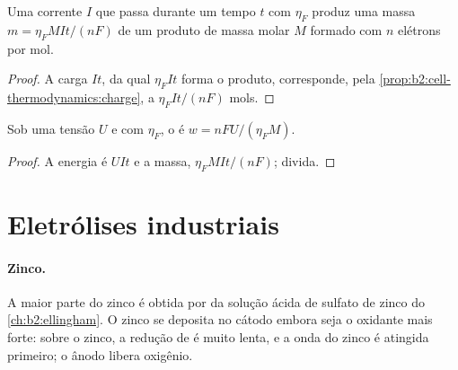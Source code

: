 \begin{proposition}\label{prop:b2:batteries-electrolysis:faraday-mass}
Uma corrente $I$ que passa durante um tempo $t$ com 
$\eta_F$ produz uma massa $m = \eta_F MIt/(nF)$ de um produto de massa molar
$M$ formado com $n$ elétrons por mol.
\end{proposition}

\begin{proof}
A carga $It$, da qual $\eta_F It$ forma o produto, corresponde, pela
\cref{prop:b2:cell-thermodynamics:charge}, a $\eta_F It/(nF)$ mols.
\end{proof}

\begin{proposition}\label{prop:b2:batteries-electrolysis:energy}
Sob uma tensão $U$ e com  $\eta_F$, o  é $w = nFU/(\eta_F M)$.
\end{proposition}

\begin{proof}
A energia é $UIt$ e a massa, $\eta_F MIt/(nF)$; divida.
\end{proof}

\section{Eletrólises industriais}

\paragraph{Zinco.} A maior parte do zinco é obtida por  da solução
ácida de sulfato de zinco do \cref{ch:b2:ellingham}. O zinco se deposita no
cátodo embora  seja o oxidante mais forte: sobre o zinco, a redução de
 é muito lenta, e a onda do zinco é atingida primeiro; o ânodo libera
oxigênio.

